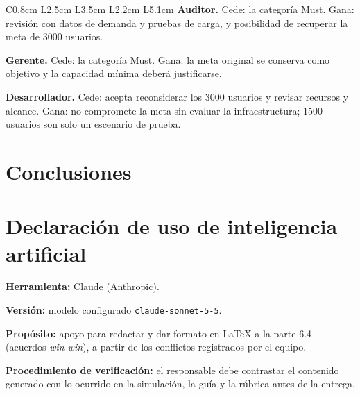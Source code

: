 \documentclass[12pt,a4paper]{article}
\begin{document}
\begin{longtable}{
    C{0.8cm}
    L{2.5cm}
    L{3.5cm}
    L{2.2cm}
    L{5.1cm}
}
\textbf{Auditor.} Cede: la categoría Must. Gana:
revisión con datos de demanda y pruebas de carga, y
posibilidad de recuperar la meta de 3000 usuarios.

\textbf{Gerente.} Cede: la categoría Must. Gana: la
meta original se conserva como objetivo y la capacidad
mínima deberá justificarse.

\textbf{Desarrollador.} Cede: acepta reconsiderar los
3000 usuarios y revisar recursos y alcance. Gana: no
compromete la meta sin evaluar la infraestructura;
1500 usuarios son solo un escenario de prueba. \\

\end{longtable}

\endgroup


\section{Conclusiones}


\section{Declaración de uso de inteligencia artificial}

\textbf{Herramienta:} Claude (Anthropic).

\textbf{Versión:} modelo configurado
\texttt{claude-sonnet-5-5}.

\textbf{Propósito:} apoyo para redactar y dar formato en
\LaTeX{} a la parte 6.4 (acuerdos \textit{win-win}), a
partir de los conflictos registrados por el equipo.

\textbf{Procedimiento de verificación:} el responsable
debe contrastar el contenido generado con lo ocurrido en
la simulación, la guía y la rúbrica antes de la entrega.


\end{document}
